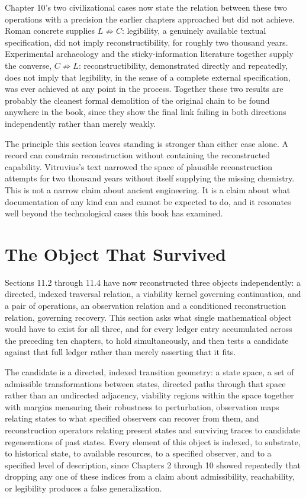 \documentclass[11pt]{book}
\begin{document}
Chapter 10's two civilizational cases now state the relation between these two operations with a precision the earlier chapters approached but did not achieve. Roman concrete supplies \(L \not\Rightarrow C\): legibility, a genuinely available textual specification, did not imply reconstructibility, for roughly two thousand years. Experimental archaeology and the sticky-information literature together supply the converse, \(C \not\Rightarrow L\): reconstructibility, demonstrated directly and repeatedly, does not imply that legibility, in the sense of a complete external specification, was ever achieved at any point in the process. Together these two results are probably the cleanest formal demolition of the original chain to be found anywhere in the book, since they show the final link failing in both directions independently rather than merely weakly.

The principle this section leaves standing is stronger than either case alone. A record can constrain reconstruction without containing the reconstructed capability. Vitruvius's text narrowed the space of plausible reconstruction attempts for two thousand years without itself supplying the missing chemistry. This is not a narrow claim about ancient engineering. It is a claim about what documentation of any kind can and cannot be expected to do, and it resonates well beyond the technological cases this book has examined.

\section{The Object That Survived}

Sections 11.2 through 11.4 have now reconstructed three objects independently: a directed, indexed traversal relation, a viability kernel governing continuation, and a pair of operations, an observation relation and a conditioned reconstruction relation, governing recovery. This section asks what single mathematical object would have to exist for all three, and for every ledger entry accumulated across the preceding ten chapters, to hold simultaneously, and then tests a candidate against that full ledger rather than merely asserting that it fits.

The candidate is a directed, indexed transition geometry: a state space, a set of admissible transformations between states, directed paths through that space rather than an undirected adjacency, viability regions within the space together with margins measuring their robustness to perturbation, observation maps relating states to what specified observers can recover from them, and reconstruction operators relating present states and surviving traces to candidate regenerations of past states. Every element of this object is indexed, to substrate, to historical state, to available resources, to a specified observer, and to a specified level of description, since Chapters 2 through 10 showed repeatedly that dropping any one of these indices from a claim about admissibility, reachability, or legibility produces a false generalization.
\end{document}
